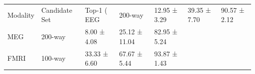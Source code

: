 \begin{tabular}{lllll}
\toprule
Modality & Candidate Set & Top-1 (%
\midrule
EEG & 200-way & 12.95 ± 3.29 & 39.35 ± 7.70 & 90.57 ± 2.12 \\
MEG & 200-way & 8.00 ± 4.08 & 25.12 ± 11.04 & 82.95 ± 5.24 \\
FMRI & 100-way & 33.33 ± 6.60 & 67.67 ± 5.44 & 93.87 ± 1.43 \\
\bottomrule
\end{tabular}
